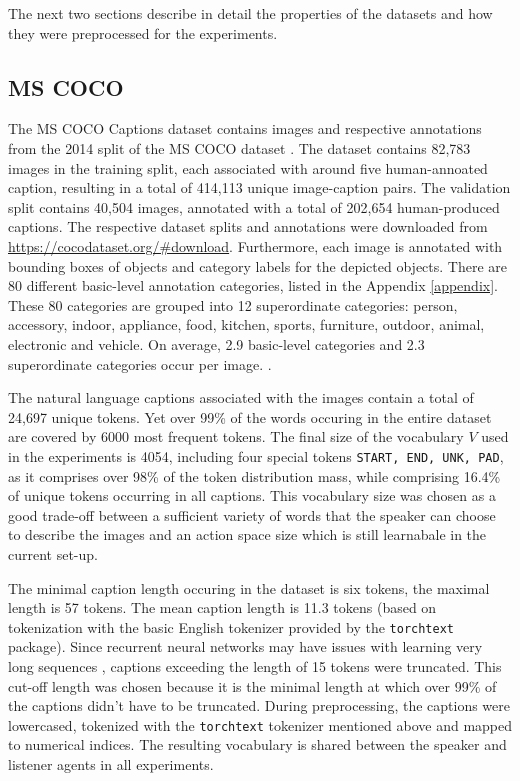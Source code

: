 The next two sections describe in detail the properties of the datasets and how they were preprocessed for the experiments.

\subsection{MS COCO}
The MS COCO Captions dataset \parencite{chen2015microsoft} contains images and respective annotations from the 2014 split of the MS COCO dataset \parencite{lin2014microsoft}. The dataset contains 82,783 images in the training split, each associated with around five human-annoated caption, resulting in a total of 414,113 unique image-caption pairs. The validation split contains 40,504 images, annotated with a total of 202,654 human-produced captions. The respective dataset splits and annotations were downloaded from \url{https://cocodataset.org/#download}.
Furthermore, each image is annotated with bounding boxes of objects and category labels for the depicted objects. There are 80 different basic-level annotation categories, listed in the Appendix \ref{appendix}. These 80 categories are grouped into 12 superordinate categories: person, accessory, indoor, appliance, food, kitchen, sports, furniture, outdoor, animal, electronic and vehicle.
On average, 2.9 basic-level categories and 2.3 superordinate categories occur per image.
.

The natural language captions associated with the images contain a total of 24,697 unique tokens. Yet over 99\% of the words occuring in the entire dataset are covered by 6000 most frequent tokens. 
The final size of the vocabulary $V$ used in the experiments is 4054, including four special tokens \texttt{START, END, UNK, PAD}, as it comprises over 98\% of the token distribution mass, while comprising 16.4\% of unique tokens occurring in all captions. This vocabulary size was chosen as a good trade-off between a sufficient variety of words that the speaker can choose to describe the images and an action space size which is still learnabale in the current set-up. 

The minimal caption length occuring in the dataset is six tokens, the maximal length is 57 tokens. The mean caption length is 11.3 tokens (based on tokenization with the basic English tokenizer provided by the \texttt{torchtext} package). Since recurrent neural networks may have issues with learning very long sequences , captions exceeding the length of 15 tokens were truncated. This cut-off length was chosen because it is the minimal length at which over 99\% of the captions didn't have to be truncated. 
During preprocessing, the captions were lowercased, tokenized with the \texttt{torchtext} tokenizer mentioned above and mapped to numerical indices.  The resulting vocabulary is shared between the speaker and listener agents in all experiments. 

